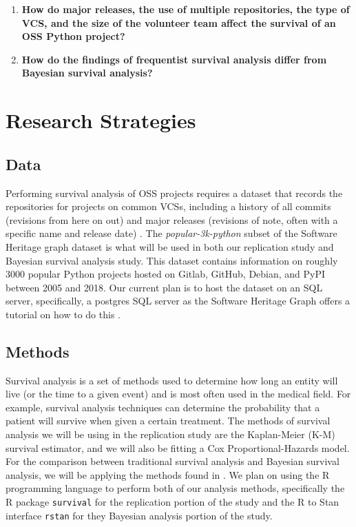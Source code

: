 \documentclass[conference]{IEEEtran}
\begin{document}
\begin{enumerate}
    \item \textbf{How do major releases, the use of multiple repositories, the type of VCS, and the size of the volunteer team affect the survival of an OSS Python project?}\\
    \item \textbf{How do the findings of frequentist survival analysis differ from Bayesian survival analysis?}
\end{enumerate}

\section{Research Strategies}

\subsection{Data}

Performing survival analysis of OSS projects requires a dataset that records the repositories for projects on common VCSs, including a history of all commits (revisions from here on out) and major releases (revisions of note, often with a specific name and release date) \cite{ali2020cheating}. The \emph{popular-3k-python} subset of the Software Heritage graph dataset \cite{pietri2019software} is what will be used in both our replication study and Bayesian survival analysis study. This dataset contains information on roughly 3000 popular Python projects hosted on Gitlab, GitHub, Debian, and PyPI between 2005 and 2018. Our current plan is to host the dataset on an SQL server, specifically, a postgres SQL server as the Software Heritage Graph offers a tutorial on how to do this \cite{SQLdataset}.
 
\subsection{Methods}

Survival analysis is a set of methods used to determine how long an entity will live (or the time to a given event) and is most often used in the medical field. For example, survival analysis techniques can determine the probability that a patient will survive when given a certain treatment. The methods of survival analysis we will be using in the replication study are the Kaplan-Meier (K-M) survival estimator, and we will also be fitting a Cox Proportional-Hazards model. For the comparison between traditional survival analysis and Bayesian survival analysis, we will be applying the methods found in \cite{kelter2020bayesian}. We plan on using the R programming language to perform both of our analysis methods, specifically the R package \texttt{survival} for the replication portion of the study and the R to Stan interface \texttt{rstan} for they Bayesian analysis portion of the study.
\end{document}
